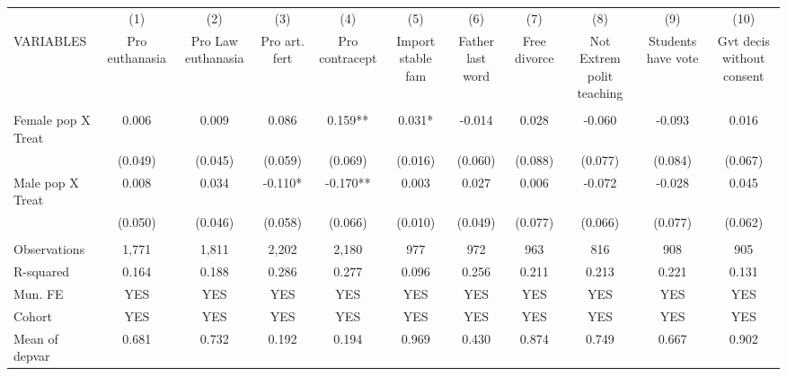 \begin{tabular}{lcccccccccc} \hline
 & (1) & (2) & (3) & (4) & (5) & (6) & (7) & (8) & (9) & (10) \\
VARIABLES & Pro euthanasia & Pro Law euthanasia & Pro art. fert & Pro contracept & Import stable fam & Father last word & Free divorce & Not Extrem polit teaching & Students have vote & Gvt decis without consent \\ \hline
 &  &  &  &  &  &  &  &  &  &  \\
Female pop X Treat & 0.006 & 0.009 & 0.086 & 0.159** & 0.031* & -0.014 & 0.028 & -0.060 & -0.093 & 0.016 \\
 & (0.049) & (0.045) & (0.059) & (0.069) & (0.016) & (0.060) & (0.088) & (0.077) & (0.084) & (0.067) \\
Male pop X Treat & 0.008 & 0.034 & -0.110* & -0.170** & 0.003 & 0.027 & 0.006 & -0.072 & -0.028 & 0.045 \\
 & (0.050) & (0.046) & (0.058) & (0.066) & (0.010) & (0.049) & (0.077) & (0.066) & (0.077) & (0.062) \\
 &  &  &  &  &  &  &  &  &  &  \\
Observations & 1,771 & 1,811 & 2,202 & 2,180 & 977 & 972 & 963 & 816 & 908 & 905 \\
R-squared & 0.164 & 0.188 & 0.286 & 0.277 & 0.096 & 0.256 & 0.211 & 0.213 & 0.221 & 0.131 \\
Mun. FE & YES & YES & YES & YES & YES & YES & YES & YES & YES & YES \\
Cohort & YES & YES & YES & YES & YES & YES & YES & YES & YES & YES \\
 Mean of depvar & 0.681 & 0.732 & 0.192 & 0.194 & 0.969 & 0.430 & 0.874 & 0.749 & 0.667 & 0.902 \\ \hline
\end{tabular}
